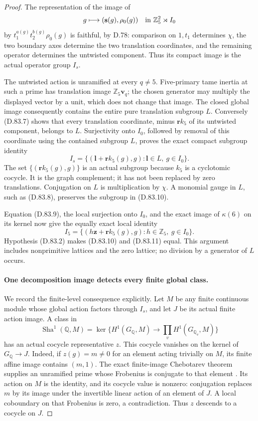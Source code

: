 \begin{proof}
The representation of the image of
\[
 g\longmapsto(\mathbf s(g),\rho_0(g))
           \quad\hbox{in }\mathbb Z_5^2\rtimes I_0
\]
by \(t_1^{a(g)}t_2^{b(g)}\rho_0(g)\) is faithful, by D.78:
comparison on \(1,t_1\) determines \(\chi\), the two boundary
axes determine the two translation coordinates, and the
remaining operator determines the untwisted component.
Thus its compact image is the actual operator group \(I_s\).

The untwisted action is unramified at every \(q\ne5\).
Five-primary tame inertia at such a prime has translation
image \(\mathbb Z_5\mathbf v_q\); the chosen generator may
multiply the displayed vector by a unit, which does not
change that image. The closed global image consequently
contains the entire pure translation subgroup \(L\).
Conversely (D.83.7) shows that every translation coordinate,
minus \(\mathbf r k_5\) of its untwisted component, belongs
to \(L\). Surjectivity onto \(I_0\), followed by removal of
this coordinate using the contained subgroup \(L\), proves
the exact compact subgroup identity
\[
 I_s=\{(\mathbf l+\mathbf r k_5(g),g):
                       \mathbf l\in L,\ g\in I_0\}.             \tag{D.83.10}
\]
The set \(\{(\mathbf r k_5(g),g)\}\) is an actual subgroup
because \(k_5\) is a cyclotomic cocycle. It is the graph
complement; it has not been replaced by zero translations.
Conjugation on \(L\) is multiplication by \(\chi\).
A monomial gauge in \(L\), such as (D.83.8), preserves
the subgroup in (D.83.10).

Equation (D.83.9), the local surjection onto \(I_0\),
and the exact image of \(\kappa(6)\) on its kernel now
give the equally exact local identity
\[
 I_5=\{(h\mathbf z+\mathbf r k_5(g),g):
                            h\in\mathbb Z_5,\ g\in I_0\}.      \tag{D.83.11}
\]
Hypothesis (D.83.2) makes (D.83.10) and (D.83.11) equal.
This argument includes nonprimitive lattices and the zero
lattice; no division by a generator of \(L\) occurs.

\paragraph{One decomposition image detects every finite global class.}
We record the finite-level consequence explicitly. Let \(M\)
be any finite continuous module whose global action factors
through \(I_s\), and let \(J\) be its actual finite action
image. A class in
\[
 \operatorname{Sha}^1(\mathbb Q,M)
    =\ker\{H^1(G_{\mathbb Q},M)
                         \longrightarrow\prod_vH^1(G_{\mathbb Q_v},M)\}
\]
has an actual cocycle representative \(z\). This cocycle
vanishes on the kernel of \(G_{\mathbb Q}\to J\).
Indeed, if \(z(g)=m\ne0\) for an element acting trivially
on \(M\), its finite affine image contains \((m,1)\).
The exact finite-image Chebotarev theorem supplies an
unramified prime whose Frobenius is conjugate to that element
\cite[V, Theorem 3.23]{PBC_MilneCFT}. Its action on \(M\)
is the identity, and its cocycle value is nonzero: conjugation
replaces \(m\) by its image under the invertible linear
action of an element of \(J\).
A local coboundary on that Frobenius is zero, a contradiction.
Thus \(z\) descends to a cocycle on \(J\).


\end{proof}

